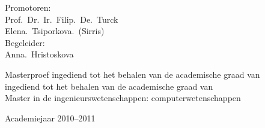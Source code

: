 \begin{titlepage}
\begin{center}
Promotoren:\\
Prof.~Dr.~Ir.~Filip.~De.~Turck \\
Elena.~Tsiporkova.~(Sirris) \\
Begeleider:\\
Anna.~Hristoskova\\

\vspace{2cm}

Masterproef ingediend tot het behalen van de academische graad van\\
ingediend tot het behalen van de academische graad van\\
Master in de ingenieurswetenschappen: computerwetenschappen

\vspace{1cm}

Academiejaar 2010--2011

\end{center}
\end{titlepage}
